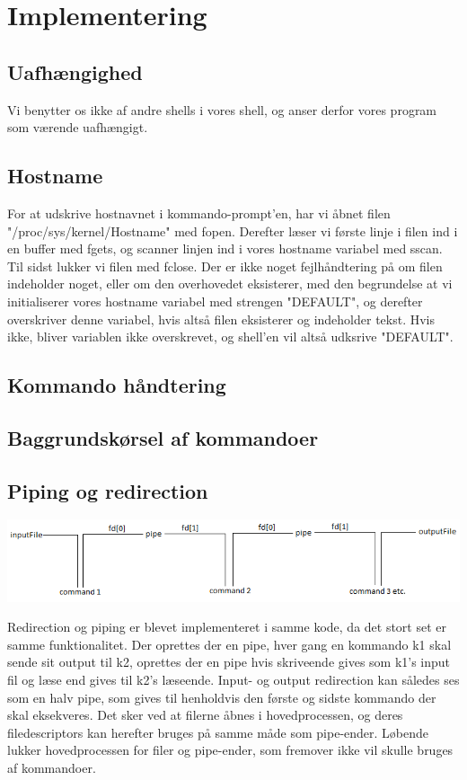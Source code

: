 \section{Implementering}
\subsection{Uafhængighed}


Vi benytter os ikke af andre shells i vores shell, og anser derfor vores program som værende uafhængigt. 

\subsection{Hostname}
For at udskrive hostnavnet i kommando-prompt'en, har vi åbnet filen "/proc/sys/kernel/Hostname" med fopen. Derefter læser vi første linje i filen ind i en buffer med fgets, og scanner linjen ind i vores hostname variabel med sscan. Til sidst lukker vi filen med fclose. Der er ikke noget fejlhåndtering på om filen indeholder noget, eller om den overhovedet eksisterer, med den begrundelse at vi initialiserer vores hostname variabel med strengen "DEFAULT", og derefter overskriver denne variabel, hvis altså filen eksisterer og indeholder tekst. Hvis ikke, bliver variablen ikke overskrevet, og shell'en vil altså udksrive "DEFAULT".

\subsection{Kommando håndtering}

\subsection{Baggrundskørsel af kommandoer}

\subsection{Piping og redirection}
\includegraphics[width=1.1\textwidth]{pipefig}\par\vspace{1cm}
Redirection og piping er blevet implementeret i samme kode, da det stort set er samme funktionalitet.
Der oprettes der en pipe, hver gang en kommando k1 skal sende sit output til k2, oprettes der en pipe hvis skriveende gives som k1's input fil og læse end gives til k2's læseende. Input- og output redirection kan således ses som en halv pipe, som gives til henholdvis den første og sidste kommando der skal eksekveres. Det sker ved at filerne åbnes i hovedprocessen, og deres filedescriptors kan herefter bruges på samme måde som pipe-ender. Løbende lukker hovedprocessen for filer og pipe-ender, som fremover ikke vil skulle bruges af kommandoer.


